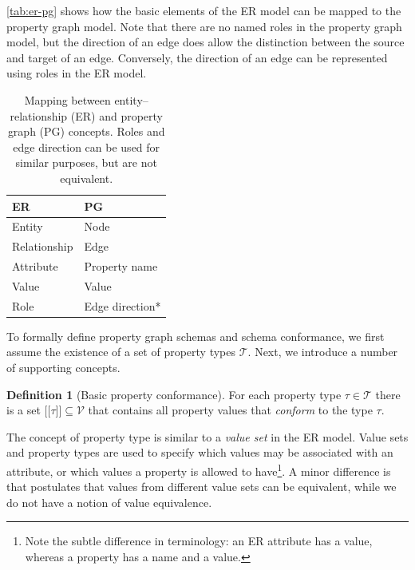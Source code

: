 \documentclass{report}
\theoremstyle{definition}
\newtheorem{definition}{Definition}
\newcommand{\ptype}{\tau}
\newcommand{\ptypes}{\mathcal{T}}
\newcommand{\lsem}{\ensuremath{[\![}}
\newcommand{\rsem}{\ensuremath{]\!]}}
\newcommand{\sem}[1]{\ensuremath{\lsem #1 \rsem}}
\begin{document}
\autoref{tab:er-pg} shows how the basic elements of the ER model can be mapped to the property graph model. Note that there are no named roles in the property graph model, but the direction of an edge does allow the distinction between the source and target of an edge. Conversely, the direction of an edge can be represented using roles in the ER model.

\begin{table}[t]
  \centering
  \begin{tabular}{ll}
    \hline
    \textbf{ER}  & \textbf{PG}     \\
    \hline
    Entity       & Node            \\
    Relationship & Edge            \\
    Attribute    & Property name   \\
    Value        & Value           \\
    Role         & Edge direction* \\
    \hline
  \end{tabular}
  \caption[Mapping between entity--relationship and property graph concepts]{Mapping between entity--relationship (ER) and property graph (PG) concepts. Roles and edge direction can be used for similar purposes, but are not equivalent.}
  \label{tab:er-pg}
\end{table}

To formally define property graph schemas and schema conformance, we first assume the existence of a set of property types $\mathcal{T}$. Next, we introduce a number of supporting concepts.

\begin{definition}[Basic property conformance]
  \label{def:property-conformance-basic}
  For each property type $\ptype \in \ptypes$ there is a set $\sem{\ptype} \subseteq \mathcal{V}$ that contains all property values that \emph{conform} to the type $\ptype$.
\end{definition}

The concept of property type is similar to a \emph{value set} in the ER model. Value sets and property types are used to specify which values may be associated with an attribute, or which values a property is allowed to have\footnote{Note the subtle difference in terminology: an ER attribute has a value, whereas a property has a name and a value.}. A minor difference is that \citet{chen1976entity} postulates that values from different value sets can be equivalent, while we do not have a notion of value equivalence.
\end{document}
